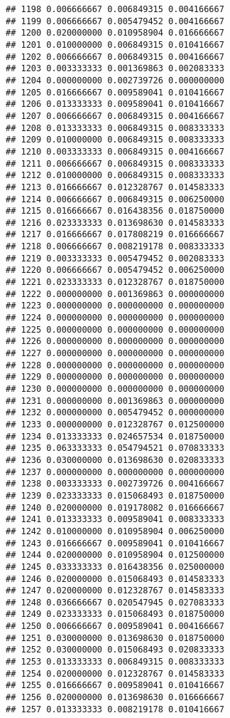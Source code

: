 \documentclass[
]{article}
\begin{document}
\begin{verbatim}
## 1198 0.006666667 0.006849315 0.004166667
## 1199 0.006666667 0.005479452 0.004166667
## 1200 0.020000000 0.010958904 0.016666667
## 1201 0.010000000 0.006849315 0.010416667
## 1202 0.006666667 0.006849315 0.004166667
## 1203 0.003333333 0.001369863 0.002083333
## 1204 0.000000000 0.002739726 0.000000000
## 1205 0.016666667 0.009589041 0.010416667
## 1206 0.013333333 0.009589041 0.010416667
## 1207 0.006666667 0.006849315 0.004166667
## 1208 0.013333333 0.006849315 0.008333333
## 1209 0.010000000 0.006849315 0.008333333
## 1210 0.003333333 0.006849315 0.004166667
## 1211 0.006666667 0.006849315 0.008333333
## 1212 0.010000000 0.006849315 0.008333333
## 1213 0.016666667 0.012328767 0.014583333
## 1214 0.006666667 0.006849315 0.006250000
## 1215 0.016666667 0.016438356 0.018750000
## 1216 0.023333333 0.013698630 0.014583333
## 1217 0.016666667 0.017808219 0.016666667
## 1218 0.006666667 0.008219178 0.008333333
## 1219 0.003333333 0.005479452 0.002083333
## 1220 0.006666667 0.005479452 0.006250000
## 1221 0.023333333 0.012328767 0.018750000
## 1222 0.000000000 0.001369863 0.000000000
## 1223 0.000000000 0.000000000 0.000000000
## 1224 0.000000000 0.000000000 0.000000000
## 1225 0.000000000 0.000000000 0.000000000
## 1226 0.000000000 0.000000000 0.000000000
## 1227 0.000000000 0.000000000 0.000000000
## 1228 0.000000000 0.000000000 0.000000000
## 1229 0.000000000 0.000000000 0.000000000
## 1230 0.000000000 0.000000000 0.000000000
## 1231 0.000000000 0.001369863 0.000000000
## 1232 0.000000000 0.005479452 0.000000000
## 1233 0.000000000 0.012328767 0.012500000
## 1234 0.013333333 0.024657534 0.018750000
## 1235 0.063333333 0.054794521 0.070833333
## 1236 0.030000000 0.013698630 0.020833333
## 1237 0.000000000 0.000000000 0.000000000
## 1238 0.003333333 0.002739726 0.004166667
## 1239 0.023333333 0.015068493 0.018750000
## 1240 0.020000000 0.019178082 0.016666667
## 1241 0.013333333 0.009589041 0.008333333
## 1242 0.010000000 0.010958904 0.006250000
## 1243 0.016666667 0.009589041 0.010416667
## 1244 0.020000000 0.010958904 0.012500000
## 1245 0.033333333 0.016438356 0.025000000
## 1246 0.020000000 0.015068493 0.014583333
## 1247 0.020000000 0.012328767 0.014583333
## 1248 0.036666667 0.020547945 0.027083333
## 1249 0.023333333 0.015068493 0.018750000
## 1250 0.006666667 0.009589041 0.004166667
## 1251 0.030000000 0.013698630 0.018750000
## 1252 0.030000000 0.015068493 0.020833333
## 1253 0.013333333 0.006849315 0.008333333
## 1254 0.020000000 0.012328767 0.014583333
## 1255 0.016666667 0.009589041 0.010416667
## 1256 0.020000000 0.013698630 0.016666667
## 1257 0.013333333 0.008219178 0.010416667

\end{verbatim}
\end{document}
